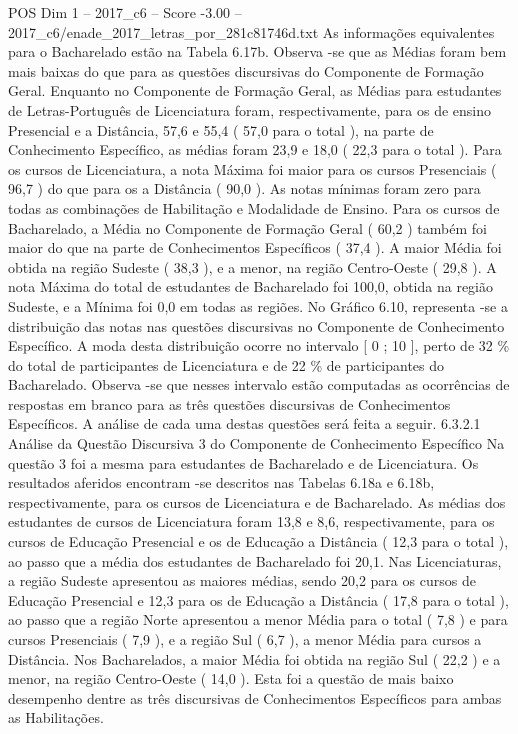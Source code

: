 \begin{textsample}{POS Dim 1 – 2017\_c6 – Score -3.00 – 2017\_c6/enade\_2017\_letras\_por\_281c81746d.txt}
As informações equivalentes para o Bacharelado estão na Tabela 6.17b.
Observa -se que as Médias foram bem mais baixas do que para as questões discursivas do Componente de Formação Geral.
Enquanto no Componente de Formação Geral, as Médias para estudantes de Letras-Português de Licenciatura foram, respectivamente, para os de ensino Presencial e a Distância, 57,6 e 55,4 ( 57,0 para o total ), na parte de Conhecimento Específico, as médias foram 23,9 e 18,0 ( 22,3 para o total ).
Para os cursos de Licenciatura, a nota Máxima foi maior para os cursos Presenciais ( 96,7 ) do que para os a Distância ( 90,0 ).
As notas mínimas foram zero para todas as combinações de Habilitação e Modalidade de Ensino.
Para os cursos de Bacharelado, a Média no Componente de Formação Geral ( 60,2 ) também foi maior do que na parte de Conhecimentos Específicos ( 37,4 ).
A maior Média foi obtida na região Sudeste ( 38,3 ), e a menor, na região Centro-Oeste ( 29,8 ).
A nota Máxima do total de estudantes de Bacharelado foi 100,0, obtida na região Sudeste, e a Mínima foi 0,0 em todas as regiões.
No Gráfico 6.10, representa -se a distribuição das notas nas questões discursivas no Componente de Conhecimento Específico.
A moda desta distribuição ocorre no intervalo [ 0 ; 10 ], perto de 32 \% do total de participantes de Licenciatura e de 22 \% de participantes do Bacharelado.
Observa -se que nesses intervalo estão computadas as ocorrências de respostas em branco para as três questões discursivas de Conhecimentos Específicos.
A análise de cada uma destas questões será feita a seguir. 6.3.2.1 Análise da Questão Discursiva 3 do Componente de Conhecimento Específico Na questão 3 foi a mesma para estudantes de Bacharelado e de Licenciatura.
Os resultados aferidos encontram -se descritos nas Tabelas 6.18a e 6.18b, respectivamente, para os cursos de Licenciatura e de Bacharelado.
As médias dos estudantes de cursos de Licenciatura foram 13,8 e 8,6, respectivamente, para os cursos de Educação Presencial e os de Educação a Distância ( 12,3 para o total ), ao passo que a média dos estudantes de Bacharelado foi 20,1.
Nas Licenciaturas, a região Sudeste apresentou as maiores médias, sendo 20,2 para os cursos de Educação Presencial e 12,3 para os de Educação a Distância ( 17,8 para o total ), ao passo que a região Norte apresentou a menor Média para o total ( 7,8 ) e para cursos Presenciais ( 7,9 ), e a região Sul ( 6,7 ), a menor Média para cursos a Distância.
Nos Bacharelados, a maior Média foi obtida na região Sul ( 22,2 ) e a menor, na região Centro-Oeste ( 14,0 ).
Esta foi a questão de mais baixo desempenho dentre as três discursivas de Conhecimentos Específicos para ambas as Habilitações.

\end{textsample}
